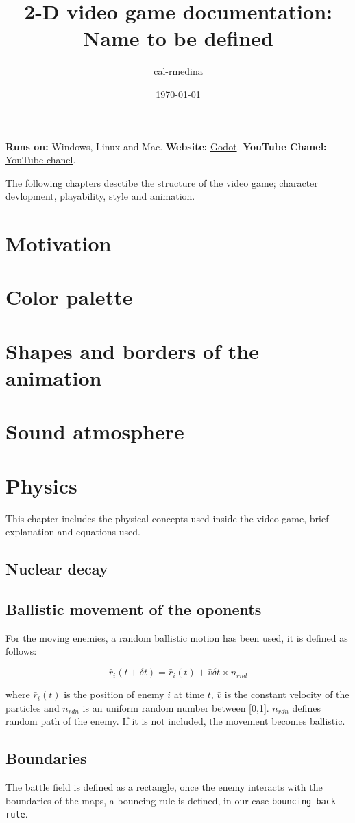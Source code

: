 \documentclass{article}
\title{2-D video game documentation:\\Name to be defined}
\date{\today}
\author{cal-rmedina}
\begin{document}
  \maketitle

\textbf{Runs on:} Windows, Linux and Mac.
\textbf{Website:} \href{https://godotengine.org/}{Godot}.
\textbf{YouTube Chanel:} \href{https://www.youtube.com/@GodotEngineOfficial/featured}{YouTube chanel}.


The following chapters desctibe the structure of the video game; character devlopment, playability, style and animation.

\section{Motivation}
\section{Color palette}
\section{Shapes and borders of the animation}
\section{Sound atmosphere}
\section{Physics}

This chapter includes the physical concepts used inside the video game, brief explanation and equations used.

\subsection{Nuclear decay}

\subsection{Ballistic movement of the oponents}

For the moving enemies, a random ballistic motion has been used, it is defined as follows:

\begin{equation}
\bar{r}_i(t+\delta t) = \bar{r}_i(t) + \bar{v}\delta t\times n_{rnd}
\end{equation}

where $\bar{r}_i(t)$ is the position of enemy $i$ at time $t$, $\bar{v}$ is the
constant velocity of the particles and $n_{rdn}$ is an uniform random number
between [0,1]. {$n_{rdn}$} defines random path of the enemy. If it is not
included, the movement becomes ballistic.

\subsection{Boundaries}

The battle field is defined as a rectangle, once the enemy interacts with the boundaries of the maps, a bouncing rule is defined, in our case \texttt{bouncing back rule}.
\end{document}
